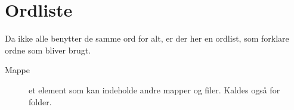 \chapter{Ordliste}
Da ikke alle benytter de samme ord for alt, er der her en ordlist, som forklare ordne som bliver brugt.
\begin{description}
	\item[Mappe] et element som kan indeholde andre mapper og filer. Kaldes også for folder. 
\end{description}